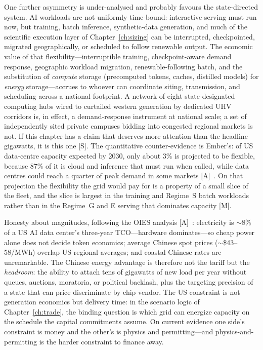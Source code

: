 One further asymmetry is under-analysed and probably favours the state-directed system. AI workloads are not uniformly time-bound: interactive serving must run now, but training, batch inference, synthetic-data generation, and much of the scientific execution layer of Chapter~\ref{ch:sizing} can be interrupted, checkpointed, migrated geographically, or scheduled to follow renewable output. The economic value of that flexibility---interruptible training, checkpoint-aware demand response, geographic workload migration, renewable-following batch, and the substitution of \emph{compute} storage (precomputed tokens, caches, distilled models) for \emph{energy} storage---accrues to whoever can coordinate siting, transmission, and scheduling across a national footprint. A network of eight state-designated computing hubs wired to curtailed western generation by dedicated UHV corridors is, in effect, a demand-response instrument at national scale; a set of independently sited private campuses bidding into congested regional markets is not. If this chapter has a claim that deserves more attention than the headline gigawatts, it is this one [S]. The quantitative counter-evidence is Ember's: of US data-centre capacity expected by 2030, only about 3\% is projected to be flexible, because 87\% of it is cloud and inference that must run when called, while data centres could reach a quarter of peak demand in some markets [A]~\cite{cap-ember-flex}. On that projection the flexibility the grid would pay for is a property of a small slice of the fleet, and the slice is largest in the training and Regime~S batch workloads rather than in the Regime~G and E serving that dominates capacity [M].

Honesty about magnitudes, following the OIES analysis [A]~\cite{oies}: electricity is $\sim$8\% of a US AI data center's three-year TCO---hardware dominates---so cheap power alone does not decide token economics; average Chinese spot prices ($\sim$\$43--58/MWh) overlap US regional averages; and coastal Chinese rates are unremarkable. The Chinese energy advantage is therefore not the tariff but the \emph{headroom}: the ability to attach tens of gigawatts of new load per year without queues, auctions, moratoria, or political backlash, plus the targeting precision of a state that can price discriminate by chip vendor. The US constraint is not generation economics but delivery time: in the scenario logic of Chapter~\ref{ch:trade}, the binding question is which grid can energize capacity on the schedule the capital commitments assume. On current evidence one side's constraint is money and the other's is physics and permitting---and physics-and-permitting is the harder constraint to finance away.

